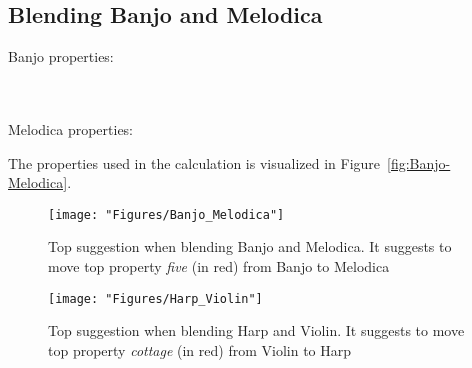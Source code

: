 \subsection{Blending Banjo and Melodica}

Banjo properties:

\noindent{}
\\\\Melodica properties:

\noindent{}
	
The properties used in the calculation is visualized in Figure~\ref{fig:Banjo-Melodica}.
		
\begin{figure} \centering \texttt{[image: "Figures/Banjo\_Melodica"]} \caption{Top suggestion when blending Banjo and Melodica. It suggests to move top property \emph{five} (in red) from Banjo to Melodica } \label{ Banjo-Melodica } \end{figure}

\begin{figure} \centering \texttt{[image: "Figures/Harp\_Violin"]} \caption{Top suggestion when blending Harp and Violin. It suggests to move top property \emph{cottage} (in red) from Violin to Harp } \label{ Harp-Violin } \end{figure}

